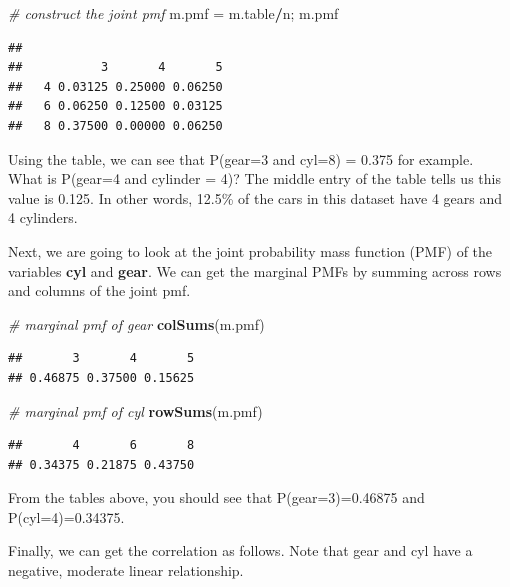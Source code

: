 \documentclass[
  11pt,
  oneside]{book}
\newenvironment{Shaded}{\begin{snugshade}}{\end{snugshade}}
\newcommand{\CommentTok}[1]{\textcolor[rgb]{0.56,0.35,0.01}{\textit{#1}}}
\newcommand{\FunctionTok}[1]{\textcolor[rgb]{0.13,0.29,0.53}{\textbf{#1}}}
\newcommand{\NormalTok}[1]{#1}
\newcommand{\OtherTok}[1]{\textcolor[rgb]{0.56,0.35,0.01}{#1}}
\newcommand{\SpecialCharTok}[1]{\textcolor[rgb]{0.81,0.36,0.00}{\textbf{#1}}}
\theoremstyle{definition}
\theoremstyle{definition}
\theoremstyle{definition}
\theoremstyle{definition}
\theoremstyle{remark}
\begin{document}
\begin{Shaded}
\begin{Highlighting}[]
\CommentTok{\# construct the joint pmf}
\NormalTok{m.pmf }\OtherTok{=}\NormalTok{ m.table}\SpecialCharTok{/}\NormalTok{n; m.pmf}
\end{Highlighting}
\end{Shaded}

\begin{verbatim}
##    
##           3       4       5
##   4 0.03125 0.25000 0.06250
##   6 0.06250 0.12500 0.03125
##   8 0.37500 0.00000 0.06250
\end{verbatim}

Using the table, we can see that P(gear=3 and cyl=8) = 0.375 for example. What is P(gear=4 and cylinder = 4)? The middle entry of the table tells us this value is 0.125. In other words, 12.5\% of the cars in this dataset have 4 gears and 4 cylinders.

Next, we are going to look at the joint probability mass function (PMF) of the variables \textbf{cyl} and \textbf{gear}. We can get the marginal PMFs by summing across rows and columns of the joint pmf.

\begin{Shaded}
\begin{Highlighting}[]
\CommentTok{\# marginal pmf of gear}
\FunctionTok{colSums}\NormalTok{(m.pmf)}
\end{Highlighting}
\end{Shaded}

\begin{verbatim}
##       3       4       5 
## 0.46875 0.37500 0.15625
\end{verbatim}

\begin{Shaded}
\begin{Highlighting}[]
\CommentTok{\# marginal pmf of cyl}
\FunctionTok{rowSums}\NormalTok{(m.pmf)}
\end{Highlighting}
\end{Shaded}

\begin{verbatim}
##       4       6       8 
## 0.34375 0.21875 0.43750
\end{verbatim}

From the tables above, you should see that P(gear=3)=0.46875 and P(cyl=4)=0.34375.

Finally, we can get the correlation as follows. Note that gear and cyl have a negative, moderate linear relationship.
\end{document}
